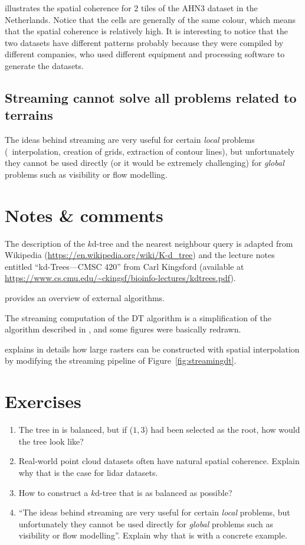 illustrates the spatial coherence for 2 tiles of the AHN3 dataset in the Netherlands.
Notice that the cells are generally of the same colour, which means that the spatial coherence is relatively high.
It is interesting to notice that the two datasets have different patterns probably because they were compiled by different companies, who used different equipment and processing software to generate the datasets.


\subsection{Streaming cannot solve all problems related to terrains}
The ideas behind streaming are very useful for certain \emph{local} problems (\eg\ interpolation, creation of grids, extraction of contour lines), but unfortunately they cannot be used directly (or it would be extremely challenging) for \emph{global} problems such as visibility or flow modelling.

%
\section{Notes \& comments}

The description of the $k$d-tree and the nearest neighbour query is adapted from Wikipedia (\url{https://en.wikipedia.org/wiki/K-d_tree}) and the lecture notes entitled ``kd-Trees---CMSC 420'' from Carl Kingsford (available at \url{https://www.cs.cmu.edu/~ckingsf/bioinfo-lectures/kdtrees.pdf}).

\citet{Vitter01} provides an overview of external algorithms.

The streaming computation of the DT algorithm is a simplification of the algorithm described in \citet{Isenburg06}, and some figures were basically redrawn.

\citet{isenburg06-1} explains in details how large rasters can be constructed with spatial interpolation by modifying the streaming pipeline of Figure~\ref{fig:streamingdt}.


%
\section{Exercises}

\begin{enumerate}
  \item The tree in  is balanced, but if ($1,3$) had been selected as the root, how would the tree look like?
  \item Real-world point cloud datasets often have natural spatial coherence. Explain why that is the case for lidar datasets.
  \item How to construct a $k$d-tree that is as balanced as possible?
  \item ``The ideas behind streaming are very useful for certain \emph{local} problems, but unfortunately they cannot be used directly for \emph{global} problems such as visibility or flow modelling''. Explain why that is with a concrete example.
\end{enumerate}
